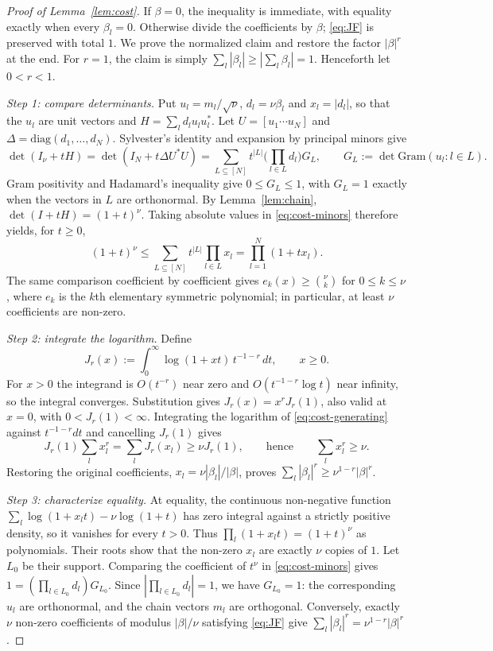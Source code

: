 \begin{proof}[Proof of Lemma~\ref{lem:cost}]
If $\beta=0$, the inequality is immediate, with equality exactly when every $\beta_l=0$. Otherwise divide the coefficients by $\beta$; \eqref{eq:JF} is preserved with total $1$. We prove the normalized claim and restore the factor $|\beta|^r$ at the end. For $r=1$, the claim is simply $\sum_l|\beta_l|\ge|\sum_l\beta_l|=1$. Henceforth let $0<r<1$.

\emph{Step 1: compare determinants.} Put $u_l=m_l/\sqrt\nu$, $d_l=\nu\beta_l$ and $x_l=|d_l|$, so that the $u_l$ are unit vectors and $H=\sum_ld_lu_lu_l^*$. Let $U=[u_1\cdots u_N]$ and $\Delta=\mathrm{diag}(d_1,\dots,d_N)$. Sylvester's identity and expansion by principal minors give
\begin{equation}
\det(I_\nu+tH)=\det(I_N+t\Delta U^*U)
=\sum_{L\subseteq[N]}t^{|L|}\Big(\prod_{l\in L}d_l\Big)G_L,
\qquad G_L:=\det\mathrm{Gram}(u_l:l\in L).
\label{eq:cost-minors}
\end{equation}
Gram positivity and Hadamard's inequality give $0\le G_L\le1$, with $G_L=1$ exactly when the vectors in $L$ are orthonormal. By Lemma~\ref{lem:chain}, $\det(I+tH)=(1+t)^\nu$. Taking absolute values in \eqref{eq:cost-minors} therefore yields, for $t\ge0$,
\begin{equation}
(1+t)^\nu\le\sum_{L\subseteq[N]}t^{|L|}\prod_{l\in L}x_l
=\prod_{l=1}^N(1+tx_l).
\label{eq:cost-generating}
\end{equation}
The same comparison coefficient by coefficient gives $e_k(x)\ge\binom\nu k$ for $0\le k\le\nu$, where $e_k$ is the $k$th elementary symmetric polynomial; in particular, at least $\nu$ coefficients are non-zero.

\emph{Step 2: integrate the logarithm.} Define
\[
J_r(x):=\int_0^\infty\log(1+xt)\,t^{-1-r}\,dt,\qquad x\ge0.
\]
For $x>0$ the integrand is $O(t^{-r})$ near zero and $O(t^{-1-r}\log t)$ near infinity, so the integral converges. Substitution gives $J_r(x)=x^rJ_r(1)$, also valid at $x=0$, with $0<J_r(1)<\infty$. Integrating the logarithm of \eqref{eq:cost-generating} against $t^{-1-r}dt$ and cancelling $J_r(1)$ gives
\[
J_r(1)\sum_lx_l^r=\sum_lJ_r(x_l)\ge\nu J_r(1),
\qquad\text{hence}\qquad \sum_lx_l^r\ge\nu.
\]
Restoring the original coefficients, $x_l=\nu|\beta_l|/|\beta|$, proves $\sum_l|\beta_l|^r\ge\nu^{1-r}|\beta|^r$.

\emph{Step 3: characterize equality.} At equality, the continuous non-negative function $\sum_l\log(1+x_lt)-\nu\log(1+t)$ has zero integral against a strictly positive density, so it vanishes for every $t>0$. Thus $\prod_l(1+x_lt)=(1+t)^\nu$ as polynomials. Their roots show that the non-zero $x_l$ are exactly $\nu$ copies of $1$. Let $L_0$ be their support. Comparing the coefficient of $t^\nu$ in \eqref{eq:cost-minors} gives $1=(\prod_{l\in L_0}d_l)G_{L_0}$. Since $|\prod_{l\in L_0}d_l|=1$, we have $G_{L_0}=1$: the corresponding $u_l$ are orthonormal, and the chain vectors $m_l$ are orthogonal. Conversely, exactly $\nu$ non-zero coefficients of modulus $|\beta|/\nu$ satisfying \eqref{eq:JF} give $\sum_l|\beta_l|^r=\nu^{1-r}|\beta|^r$.
\end{proof}

